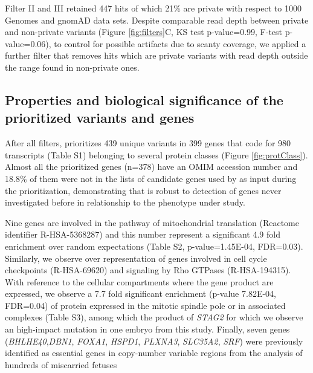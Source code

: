 Filter II and III retained 447 hits of which 21\% are private with respect to 1000 Genomes and gnomAD data sets. Despite comparable read depth between private and non-private variants (Figure \ref{fig:filters}C, KS test p-value=0.99, F-test p-value=0.06), to control for possible artifacts due to scanty coverage, we applied a further filter that removes hits which are private variants with read depth outside the range found in non-private ones.  

\subsection*{Properties and biological significance of the prioritized variants and genes} 

After all filters, \gp prioritizes 439 unique variants in 399 genes that code for 980 transcripts (Table S1) belonging to several protein classes (Figure \ref{fig:protClass}). Almost all the prioritized genes (n=378) have an OMIM accession number and 18.8\% of them were not in the lists of candidate genes used by \gp as input during the prioritization, demonstrating that \gp is robust to detection of genes never investigated before in relationship to the phenotype under study. 

Nine genes are involved in the pathway of mitochondrial translation (Reactome identifier R-HSA-5368287) and this number represent a significant 4.9 fold enrichment over random expectations (Table S2, p-value=1.45E-04, FDR=0.03). Similarly, we observe over representation of genes involved in cell cycle checkpoints (R-HSA-69620) and signaling by Rho GTPases (R-HSA-194315). With reference to the cellular compartments where the gene product are expressed, we observe a 7.7 fold significant enrichment (p-value 7.82E-04, FDR=0.04) of protein expressed in the mitotic spindle pole or in associated complexes (Table S3), among which the product of \textit{STAG2} for which we observe an high-impact mutation in one embryo from this study. Finally, seven genes (\textit{BHLHE40},\textit{DBN1}, \textit{FOXA1}, \textit{HSPD1}, \textit{PLXNA3}, \textit{SLC35A2}, \textit{SRF}) were previously identified as essential genes in copy-number variable regions from the analysis of hundreds of miscarried fetuses \cite{chen2017characterization} %

